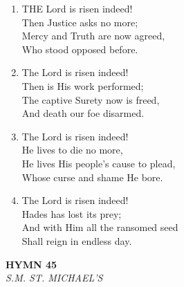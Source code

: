 \documentclass[11pt,a4paper]{article}
\begin{document}
\begin{enumerate}
    \item THE Lord is risen indeed! \\
        Then Justice asks no more; \\
        Mercy and Truth are now agreed, \\
        Who stood opposed before.

    \item The Lord is risen indeed! \\
        Then is His work performed; \\
        The captive Surety now is freed, \\
        And death our foe disarmed.

    \item The Lord is risen indeed! \\
        He lives to die no more, \\
        He lives His people's cause to plead, \\
        Whose curse and shame He bore.

    \item The Lord is risen indeed! \\
        Hades has lost its prey; \\
        And with Him all the ransomed seed \\
        Shall reign in endless day.

\end{enumerate}

\newpage
\begin{center}
    {\Large \textbf{HYMN 45}}
    \\
    \textit{S.M. ST. MICHAEL'S}
\end{center}
\vspace{1em}
\end{document}

